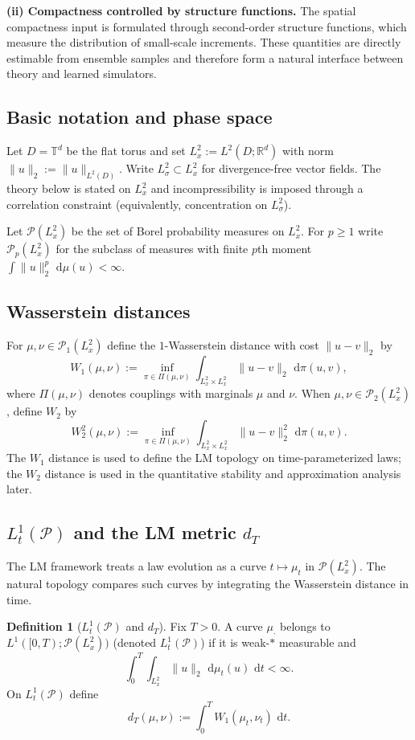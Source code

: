 \documentclass{article}
\numberwithin{equation}{section}
\theoremstyle{plain}
\theoremstyle{definition}
\newtheorem{definition}[theorem]{Definition}
\theoremstyle{remark}
\newcommand{\R}{\mathbb{R}}
\newcommand{\T}{\mathbb{T}}
\newcommand{\Pcal}{\mathcal{P}}
\newcommand{\dd}{\,\mathrm{d}}
\begin{document}
\smallskip
\noindent\textbf{(ii) Compactness controlled by structure functions.}
The spatial compactness input is formulated through second-order structure functions, which measure the distribution of
small-scale increments. These quantities are directly estimable from ensemble samples and therefore form a natural
interface between theory and learned simulators.

\subsection{Basic notation and phase space}

Let $D=\T^d$ be the flat torus and set $L^2_x:=L^2(D;\R^d)$ with norm $\|u\|_2:=\|u\|_{L^2(D)}$.
Write $L^2_\sigma\subset L^2_x$ for divergence-free vector fields. The theory below is stated on $L^2_x$ and
incompressibility is imposed through a correlation constraint (equivalently, concentration on $L^2_\sigma$).

Let $\Pcal(L^2_x)$ be the set of Borel probability measures on $L^2_x$. For $p\ge 1$ write $\Pcal_p(L^2_x)$ for the
subclass of measures with finite $p$th moment $\int \|u\|_2^p\,\dd\mu(u)<\infty$.

\subsection{Wasserstein distances}

For $\mu,\nu\in\Pcal_1(L^2_x)$ define the $1$-Wasserstein distance with cost $\|u-v\|_2$ by
\[
W_1(\mu,\nu)
:=
\inf_{\pi\in\Pi(\mu,\nu)}
\int_{L^2_x\times L^2_x}\|u-v\|_2\,\dd\pi(u,v),
\]
where $\Pi(\mu,\nu)$ denotes couplings with marginals $\mu$ and $\nu$. When $\mu,\nu\in\Pcal_2(L^2_x)$, define $W_2$ by
\[
W_2^2(\mu,\nu)
:=
\inf_{\pi\in\Pi(\mu,\nu)}
\int_{L^2_x\times L^2_x}\|u-v\|_2^2\,\dd\pi(u,v).
\]
The $W_1$ distance is used to define the LM topology on time-parameterized laws; the $W_2$ distance is used in the
quantitative stability and approximation analysis later.

\subsection{$L^1_t(\Pcal)$ and the LM metric $d_T$}

The LM framework treats a law evolution as a curve $t\mapsto \mu_t$ in $\Pcal(L^2_x)$. The natural topology compares such
curves by integrating the Wasserstein distance in time.

\begin{definition}[$L^1_t(\Pcal)$ and $d_T$]\label{def:Lt1}
Fix $T>0$. A curve $\mu_\cdot$ belongs to $L^1([0,T);\Pcal(L^2_x))$ (denoted $L^1_t(\Pcal)$) if it is weak-$\ast$ measurable and
\begin{equation}\label{eq:Lt1}
\int_0^T\int_{L^2_x}\|u\|_2\,\dd\mu_t(u)\,\dd t<\infty.
\end{equation}
On $L^1_t(\Pcal)$ define
\begin{equation}\label{eq:dT}
d_T(\mu,\nu):=\int_0^T W_1(\mu_t,\nu_t)\,\dd t.
\end{equation}
\end{definition}
\end{document}
